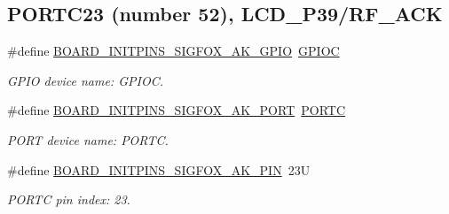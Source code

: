 \subsection*{P\+O\+R\+T\+C23 (number 52), L\+C\+D\+\_\+\+P39/\+R\+F\+\_\+\+A\+CK}
\begin{DoxyCompactItemize}
\item 
\mbox{\label{group__pin__mux_ga63f5a7928e168d7631f79f11089b4f95}} 
\#define \mbox{\hyperlink{group__pin__mux_ga63f5a7928e168d7631f79f11089b4f95}{B\+O\+A\+R\+D\+\_\+\+I\+N\+I\+T\+P\+I\+N\+S\+\_\+\+S\+I\+G\+F\+O\+X\+\_\+\+A\+K\+\_\+\+G\+P\+IO}}~\mbox{\hyperlink{group___g_p_i_o___peripheral___access___layer_ga2dca03332d620196ba943bc2346eaa08}{G\+P\+I\+OC}}
\begin{DoxyCompactList}\small\item\em G\+P\+IO device name\+: G\+P\+I\+OC. \end{DoxyCompactList}\item 
\mbox{\label{group__pin__mux_ga0a76e274aeacc2ae5aaf11244b1220ef}} 
\#define \mbox{\hyperlink{group__pin__mux_ga0a76e274aeacc2ae5aaf11244b1220ef}{B\+O\+A\+R\+D\+\_\+\+I\+N\+I\+T\+P\+I\+N\+S\+\_\+\+S\+I\+G\+F\+O\+X\+\_\+\+A\+K\+\_\+\+P\+O\+RT}}~\mbox{\hyperlink{group___p_o_r_t___peripheral___access___layer_ga68fea88642279a70246e026e7221b0a5}{P\+O\+R\+TC}}
\begin{DoxyCompactList}\small\item\em P\+O\+RT device name\+: P\+O\+R\+TC. \end{DoxyCompactList}\item 
\mbox{\label{group__pin__mux_ga442de81ce39313bb2dc9e4dd90024b1d}} 
\#define \mbox{\hyperlink{group__pin__mux_ga442de81ce39313bb2dc9e4dd90024b1d}{B\+O\+A\+R\+D\+\_\+\+I\+N\+I\+T\+P\+I\+N\+S\+\_\+\+S\+I\+G\+F\+O\+X\+\_\+\+A\+K\+\_\+\+P\+IN}}~23U
\begin{DoxyCompactList}\small\item\em P\+O\+R\+TC pin index\+: 23. \end{DoxyCompactList}\end{DoxyCompactItemize}
